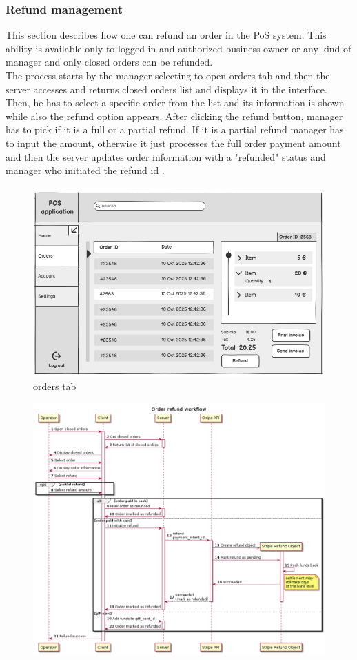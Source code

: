 \documentclass{article}
\begin{document}
    \subsubsection{Refund management}
    This section describes how one can refund an order in the PoS system. This ability is available only to logged-in and authorized business owner or any kind of manager and only closed orders can be refunded.\\ 
    The process starts by the manager selecting to open orders tab and then the server accesses and returns closed orders list and displays it in the interface. Then, he has to select a specific order from the list and its information is shown while also the refund option appears. After clicking the refund button, manager has to pick if it is a full or a partial refund. If it is a partial refund manager has to input the amount, otherwise it just processes the full order payment amount and then the server updates order information with a "refunded" status and manager who initiated the refund id .%
    \begin{figure}[H]
        \centering
        \includegraphics[width=0.9\linewidth]{PSP/lab-1/mockups/orders.png}
        \caption{orders tab}
        \label{}
    \end{figure}
    
    \begin{figure}[H]
        \centering
        \includegraphics[width=0.9\linewidth]{PSP/lab-1/diagrams/sequence/refund.png}
        \caption{}
        \label{}
    \end{figure}
\end{document}
